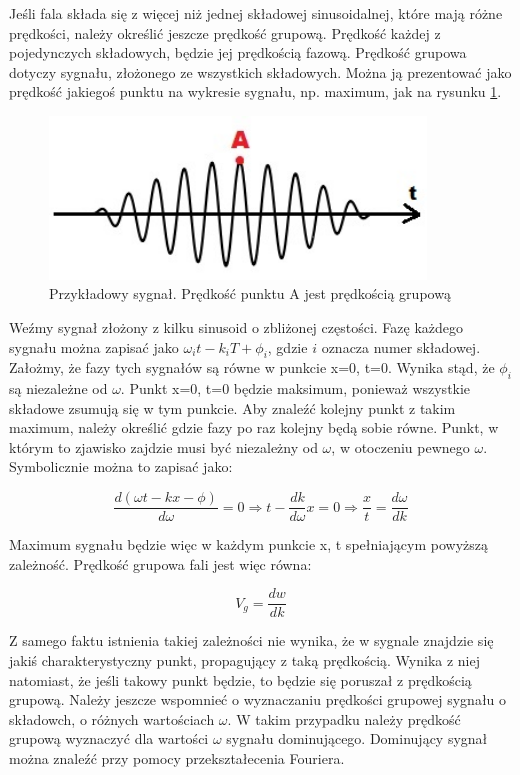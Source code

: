 Jeśli fala składa się z więcej niż jednej składowej sinusoidalnej, które mają różne prędkości, należy określić jeszcze prędkość grupową.  Prędkość każdej z pojedynczych składowych, będzie jej prędkością fazową. Prędkość grupowa dotyczy sygnału, złożonego ze wszystkich składowych. Można ją prezentować jako prędkość jakiegoś punktu na wykresie sygnału, np. maximum, jak na rysunku \ref{fig:przykladowy_sygnal}.

\begin{figure}[h]
\centering
\includegraphics[width=10cm]{Zdjecia/2/predkosc_grupowa_wierzcholek}
\caption{Przykładowy sygnał. Prędkość punktu A jest prędkością grupową}
\label{fig:przykladowy_sygnal}
\end{figure}

Weźmy sygnał złożony z kilku sinusoid o zbliżonej częstości. Fazę każdego sygnału można zapisać jako \( \omega_i t - k_i T + \phi_i \), gdzie \( i\) oznacza numer składowej. Założmy, że fazy tych sygnałów są równe w punkcie x=0, t=0. Wynika stąd, że \( \phi_i \) są niezależne od \( \omega \). Punkt x=0, t=0 będzie maksimum, ponieważ wszystkie składowe zsumują się w tym punkcie. Aby znaleźć kolejny punkt z takim maximum, należy określić gdzie fazy po raz kolejny będą sobie równe.  Punkt, w którym to zjawisko zajdzie musi być niezależny od \( \omega \), w otoczeniu pewnego \( \omega \). Symbolicznie można to zapisać jako:

\begin{equation}
\frac{d(\omega t - kx - \phi)}{d\omega}=0 \Rightarrow t-\frac{dk}{d\omega}x=0 \Rightarrow \frac{x}{t}=\frac{d\omega}{dk}
\end{equation}

Maximum sygnału będzie więc w każdym punkcie x, t spełniającym powyższą zależność. Prędkość grupowa fali jest więc równa:

\begin{equation}
V_g=\frac{dw}{dk}
\end{equation}

Z samego faktu istnienia takiej zależności nie wynika, że w sygnale znajdzie się jakiś charakterystyczny punkt, propagujący z taką prędkością. Wynika z niej natomiast, że jeśli takowy punkt będzie, to będzie się poruszał z prędkością grupową. Należy jeszcze wspomnieć o wyznaczaniu prędkości grupowej sygnału o składowch, o różnych wartościach \( \omega \). W takim przypadku należy prędkość grupową wyznaczyć dla wartości \(\omega\) sygnału dominującego. Dominujący sygnał można znaleźć przy pomocy przekształecenia Fouriera.

